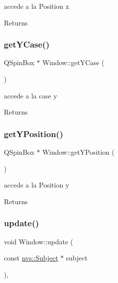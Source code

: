 accede a la Position x 

\begin{DoxyReturn}{Returns}

\end{DoxyReturn}
\mbox{\label{class_window_a4ce8d19246d36b345acb0b25a4693572}} 
\subsubsection{\texorpdfstring{get\+Y\+Case()}{getYCase()}}
{\footnotesize\ttfamily Q\+Spin\+Box $\ast$ Window\+::get\+Y\+Case (\begin{DoxyParamCaption}{ }\end{DoxyParamCaption})\hspace{0.3cm}{\ttfamily [inline]}}



accede a la case y 

\begin{DoxyReturn}{Returns}

\end{DoxyReturn}
\mbox{\label{class_window_acc5670401d2edec488b8eba20cfb1d2b}} 
\subsubsection{\texorpdfstring{get\+Y\+Position()}{getYPosition()}}
{\footnotesize\ttfamily Q\+Spin\+Box $\ast$ Window\+::get\+Y\+Position (\begin{DoxyParamCaption}{ }\end{DoxyParamCaption})\hspace{0.3cm}{\ttfamily [inline]}}



accede a la Position y 

\begin{DoxyReturn}{Returns}

\end{DoxyReturn}
\mbox{\label{class_window_affdeb2564502d9f4ca63e8c0c0c6f7c0}} 
\subsubsection{\texorpdfstring{update()}{update()}}
{\footnotesize\ttfamily void Window\+::update (\begin{DoxyParamCaption}\item[{const \mbox{\hyperlink{classnvs_1_1_subject}{nvs\+::\+Subject}} $\ast$}]{subject }\end{DoxyParamCaption})\hspace{0.3cm}{\ttfamily [override]}, {\ttfamily [virtual]}}



